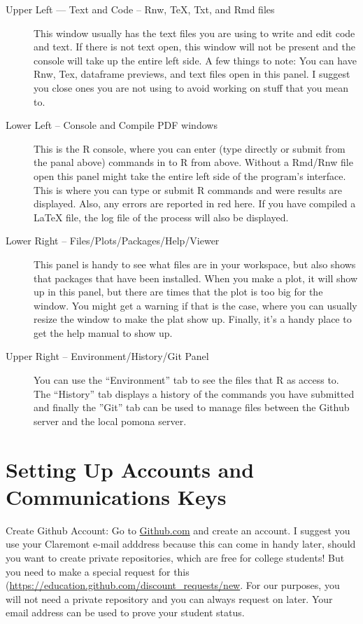 \documentclass[12pt]{../SOP4_alpha}\usepackage[]{graphicx}\usepackage[]{color}
\begin{document}
\begin{description}
  \item[Upper Left --- Text and Code -- Rnw, \TeX, Txt, and Rmd files] This window usually has the text files you are using to write and edit code and text. If there is not text open, this window will not be present and the console will take up the entire left side. A few things to note: You can have Rnw, Tex, dataframe previews, and text files open in this panel. I suggest you close ones you are not using to avoid working on stuff that you mean to.  
  
  \item[Lower Left -- Console and Compile PDF windows] This is the R console, where you can enter (type directly or submit from the panal above) commands in to R from above. Without a Rmd/Rnw file open this panel might take the entire left side of the program's interface. This is where you can type or submit R commands and were results are displayed. Also, any errors are reported in red here. If you have compiled a LaTeX file, the log file of the process will also be displayed.
  
  \item[Lower Right -- Files/Plots/Packages/Help/Viewer] This panel is handy to see what files are in your workspace, but also shows that packages that have been installed. When you make a plot, it will show up in this panel, but there are times that the plot is too big for the window. You might get a warning if that is the case, where you can usually resize the window to make the plat show up. Finally, it's a handy place to get the help manual to show up. 

  \item[Upper Right -- Environment/History/Git Panel] You can use the ``Environment'' tab to see the files that R as access to. The ``History'' tab displays a history of the commands you have submitted and finally the ''Git'' tab can be used to manage files between the Github server and the local pomona server. 
  
\end{description}

\section{Setting Up Accounts and Communications Keys}

\NP Create Github Account: Go to \href{http:\\github.com}{Github.com} and create an account. I suggest you use your Claremont e-mail adddress because this can come in handy later, should you want to create private repositories, which are free for college students! But you need to make a special request for this (\url{https://education.github.com/discount_requests/new}. For our purposes, you will not need a private repository and you can always request on later. Your email address can be used to prove your student status. 
  
\end{document}
